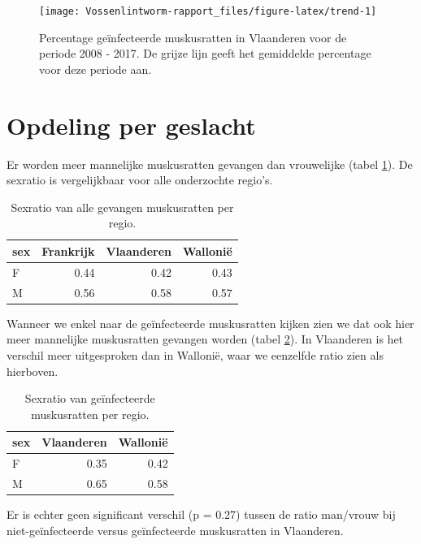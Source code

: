 \documentclass[twoside]{extreport}
\begin{document}
\begin{figure}

{\centering \texttt{[image: Vossenlintworm-rapport\_files/figure-latex/trend-1]} 

}

\caption{Percentage geïnfecteerde muskusratten in Vlaanderen voor de periode 2008 - 2017. De grijze lijn geeft het gemiddelde percentage voor deze periode aan.}\label{fig:trend}
\end{figure}

\section{Opdeling per geslacht}\label{opdeling-per-geslacht}

Er worden meer mannelijke muskusratten gevangen dan vrouwelijke (tabel
\ref{tab:sex}). De sexratio is vergelijkbaar voor alle onderzochte
regio's.

\begin{table}

\caption{\label{tab:sex}Sexratio van alle gevangen muskusratten per regio.}
\centering
\begin{tabular}[t]{l|r|r|r}
\hline
sex & Frankrijk & Vlaanderen & Wallonië\\
\hline
F & 0.44 & 0.42 & 0.43\\
\hline
M & 0.56 & 0.58 & 0.57\\
\hline
\end{tabular}
\end{table}

Wanneer we enkel naar de geïnfecteerde muskusratten kijken zien we dat
ook hier meer mannelijke muskusratten gevangen worden (tabel
\ref{tab:Psex}). In Vlaanderen is het verschil meer uitgesproken dan in
Wallonië, waar we eenzelfde ratio zien als hierboven.

\begin{table}

\caption{\label{tab:Psex}Sexratio van geïnfecteerde muskusratten per regio.}
\centering
\begin{tabular}[t]{l|r|r}
\hline
sex & Vlaanderen & Wallonië\\
\hline
F & 0.35 & 0.42\\
\hline
M & 0.65 & 0.58\\
\hline
\end{tabular}
\end{table}

Er is echter geen significant verschil (p = 0.27) tussen de ratio
man/vrouw bij niet-geïnfecteerde versus geïnfecteerde muskusratten in
Vlaanderen.
\end{document}
